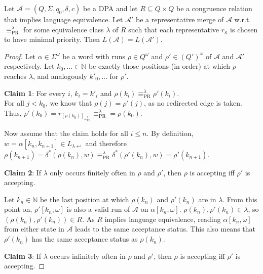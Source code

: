 \begin{theorem}
	Let $\mathcal{A} = (Q, \Sigma, q_0, \delta, c)$ be a DPA and let $R \subseteq Q \times Q$ be a congruence relation that implies language equivalence. Let $\mathcal{A}'$ be a representative merge of $\mathcal{A}$ w.r.t. $\equiv_\text{PR}^\lambda$ for some equivalence class $\lambda$ of $R$ such that each representative $r_\kappa$ is chosen to have minimal priority. Then $L(\mathcal{A}) = L(\mathcal{A}')$.
\end{theorem}

\begin{proof} 
	Let $\alpha \in \Sigma^\omega$ be a word with runs $\rho \in Q^\omega$ and $\rho' \in (Q')^\omega$ of $\mathcal{A}$ and $\mathcal{A}'$ respectively. Let $k_0, \dots \in \mathbb{N}$ be exactly those positions (in order) at which $\rho$ reaches $\lambda$, and analogously $k'_0, \dots$ for $\rho'$.

	\vspace{5pt}
	\textbf{Claim 1}: For every $i$, $k_i = k'_i$ and $\rho(k_i) \equiv_\text{PR}^\lambda \rho'(k_i)$. \\
	For all $j < k_0$, we know that $\rho(j) = \rho'(j)$, as no redirected edge is taken. Thus, $\rho'(k_0) = r_{[\rho(k_0)]_{\equiv_\text{PR}^\lambda}} \equiv_\text{PR}^\lambda = \rho(k_0)$.
	
	Now assume that the claim holds for all $i \leq n$. By definition, $w = \alpha[k_n, k_{n+1}] \in L_{\lambda \hookleftarrow}$ and therefore $\rho(k_{n+1}) = \delta^*(\rho(k_n), w) \equiv_\text{PR}^\lambda \delta^*(\rho'(k_n), w) = \rho'(k_{n+1})$.
	
	\vspace{5pt}
	\textbf{Claim 2}: If $\lambda$ only occurs finitely often in $\rho$ and $\rho'$, then $\rho$ is accepting iff $\rho'$ is accepting. 
	
	Let $k_n \in \mathbb{N}$ be the last position at which $\rho(k_n)$ and $\rho'(k_n)$ are in $\lambda$. From this point on, $\rho'[k_n, \omega]$ is also a valid run of $\mathcal{A}$ on $\alpha[k_n, \omega]$. $\rho(k_n), \rho'(k_n) \in \lambda$, so $(\rho(k_n), \rho'(k_n)) \in R$. As $R$ implies language equivalence, reading $\alpha[k_n, \omega]$ from either state in $\mathcal{A}$ leads to the same acceptance status. This also means that $\rho'(k_n)$ has the same acceptance status as $\rho(k_n)$.
	
	\vspace{5pt}
	\textbf{Claim 3}: If $\lambda$ occurs infinitely often in $\rho$ and $\rho'$, then $\rho$ is accepting iff $\rho'$ is accepting. 
	

\end{proof}
